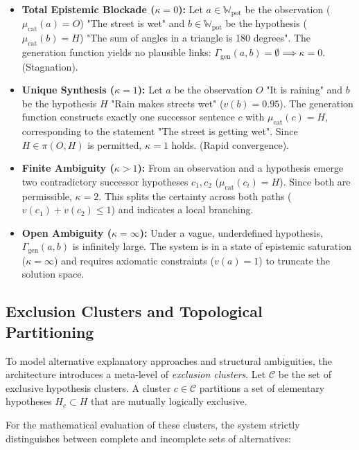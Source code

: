 \documentclass[11pt, a4paper]{article}
\begin{document}
	\begin{itemize}
		\item \textbf{Total Epistemic Blockade ($\kappa = 0$):}  
		Let $a \in \mathbb{W}_{\text{pot}}$ be the observation ($\mu_{\text{cat}}(a) = O$) "The street is wet" and $b \in \mathbb{W}_{\text{pot}}$ be the hypothesis ($\mu_{\text{cat}}(b) = H$) "The sum of angles in a triangle is 180 degrees". The generation function yields no plausible links: $\Gamma_{\text{gen}}(a,b) = \emptyset \implies \kappa = 0$. (Stagnation).
		
		\item \textbf{Unique Synthesis ($\kappa = 1$):}  
		Let $a$ be the observation $O$ "It is raining" and $b$ be the hypothesis $H$ "Rain makes streets wet" ($v(b)=0.95$). The generation function constructs exactly one successor sentence $c$ with $\mu_{\text{cat}}(c) = H$, corresponding to the statement "The street is getting wet". Since $H \in \pi(O, H)$ is permitted, $\kappa = 1$ holds. (Rapid convergence).
		
		\item \textbf{Finite Ambiguity ($\kappa > 1$):}  
		From an observation and a hypothesis emerge two contradictory successor hypotheses $c_1, c_2$ ($\mu_{\text{cat}}(c_i) = H$). Since both are permissible, $\kappa = 2$. This splits the certainty across both paths ($v(c_1) + v(c_2) \le 1$) and indicates a local branching.
		
		\item \textbf{Open Ambiguity ($\kappa = \infty$):}  
		Under a vague, underdefined hypothesis, $\Gamma_{\text{gen}}(a,b)$ is infinitely large. The system is in a state of epistemic saturation ($\kappa = \infty$) and requires axiomatic constraints ($v(a)=1$) to truncate the solution space.
	\end{itemize}
	
	\subsection{Exclusion Clusters and Topological Partitioning}
	
	To model alternative explanatory approaches and structural ambiguities, the architecture introduces a meta-level of \emph{exclusion clusters}. Let $\mathcal{C}$ be the set of exclusive hypothesis clusters. A cluster $c \in \mathcal{C}$ partitions a set of elementary hypotheses $H_c \subset H$ that are mutually logically exclusive. 
	
	For the mathematical evaluation of these clusters, the system strictly distinguishes between complete and incomplete sets of alternatives:
	
\end{document}
